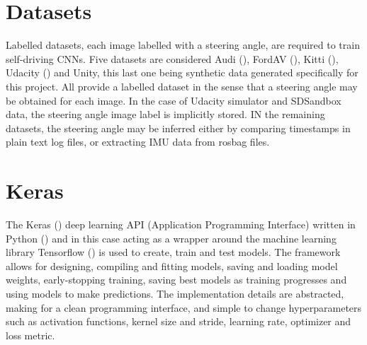 


\section{Datasets}
Labelled datasets, each image labelled with a steering angle, are required to train self-driving CNNs.
Five datasets are considered Audi (\cite{geyer2020a2d2}), FordAV (\cite{agarwal2020ford}), Kitti (\cite{geiger2013vision}), Udacity (\cite{udacity2020}) and Unity, this last one being synthetic data generated specifically for this project. All provide a labelled dataset in the sense that a steering angle may be obtained for each image. In the case of Udacity simulator and SDSandbox data, the steering angle image label is implicitly stored. IN the remaining datasets, the steering angle may be inferred either by comparing timestamps in plain text log files, or extracting IMU data from rosbag files.

\section{Keras}
The Keras (\cite{chollet2015keras}) deep learning API (Application Programming Interface) written in Python (\cite{van1995python}) and in this case acting as a wrapper around the machine learning library Tensorflow (\cite{abadi2016tensorflow}) is used to create, train and test models. The framework allows for designing, compiling and fitting models, saving and loading model weights, early-stopping training, saving best models as training progresses and using models to make predictions. The implementation details are abstracted, making for a clean programming interface, and simple to change hyperparameters such as activation functions, kernel size and stride, learning rate, optimizer and loss metric. 

